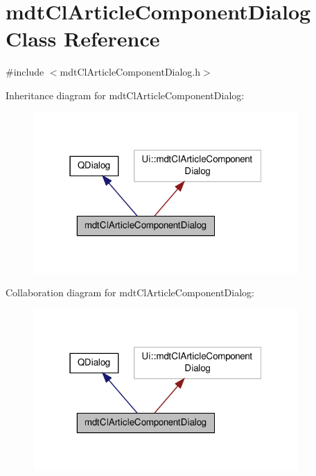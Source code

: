 \hypertarget{classmdt_cl_article_component_dialog}{\section{mdt\-Cl\-Article\-Component\-Dialog Class Reference}
\label{classmdt_cl_article_component_dialog}
}


{\ttfamily \#include $<$mdt\-Cl\-Article\-Component\-Dialog.\-h$>$}



Inheritance diagram for mdt\-Cl\-Article\-Component\-Dialog\-:
\nopagebreak
\begin{figure}[H]
\begin{center}
\leavevmode
\includegraphics[width=286pt]{classmdt_cl_article_component_dialog__inherit__graph}
\end{center}
\end{figure}


Collaboration diagram for mdt\-Cl\-Article\-Component\-Dialog\-:
\nopagebreak
\begin{figure}[H]
\begin{center}
\leavevmode
\includegraphics[width=286pt]{classmdt_cl_article_component_dialog__coll__graph}
\end{center}
\end{figure}
